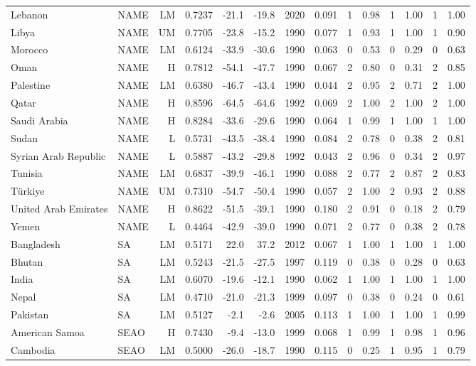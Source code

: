 \begin{longtable}{llrrrrrrrrrrrr}
Lebanon & NAME & LM & 0.7237 & -21.1 & -19.8 & 2020 & 0.091 & 1 & 0.98 & 1 & 1.00 & 1 & 1.00 \\
Libya & NAME & UM & 0.7705 & -23.8 & -15.2 & 1990 & 0.077 & 1 & 0.93 & 1 & 1.00 & 1 & 0.90 \\
Morocco & NAME & LM & 0.6124 & -33.9 & -30.6 & 1990 & 0.063 & 0 & 0.53 & 0 & 0.29 & 0 & 0.63 \\
Oman & NAME & H & 0.7812 & -54.1 & -47.7 & 1990 & 0.067 & 2 & 0.80 & 0 & 0.31 & 2 & 0.85 \\
Palestine & NAME & LM & 0.6380 & -46.7 & -43.4 & 1990 & 0.044 & 2 & 0.95 & 2 & 0.71 & 2 & 1.00 \\
Qatar & NAME & H & 0.8596 & -64.5 & -64.6 & 1992 & 0.069 & 2 & 1.00 & 2 & 1.00 & 2 & 1.00 \\
Saudi Arabia & NAME & H & 0.8284 & -33.6 & -29.6 & 1990 & 0.064 & 1 & 0.99 & 1 & 1.00 & 1 & 1.00 \\
Sudan & NAME & L & 0.5731 & -43.5 & -38.4 & 1990 & 0.084 & 2 & 0.78 & 0 & 0.38 & 2 & 0.81 \\
Syrian Arab Republic & NAME & L & 0.5887 & -43.2 & -29.8 & 1992 & 0.043 & 2 & 0.96 & 0 & 0.34 & 2 & 0.97 \\
Tunisia & NAME & LM & 0.6837 & -39.9 & -46.1 & 1990 & 0.088 & 2 & 0.77 & 2 & 0.87 & 2 & 0.83 \\
Türkiye & NAME & UM & 0.7310 & -54.7 & -50.4 & 1990 & 0.057 & 2 & 1.00 & 2 & 0.93 & 2 & 0.88 \\
United Arab Emirates & NAME & H & 0.8622 & -51.5 & -39.1 & 1990 & 0.180 & 2 & 0.91 & 0 & 0.18 & 2 & 0.79 \\
Yemen & NAME & L & 0.4464 & -42.9 & -39.0 & 1990 & 0.071 & 2 & 0.77 & 0 & 0.38 & 2 & 0.78 \\
Bangladesh & SA & LM & 0.5171 &  22.0 &  37.2 & 2012 & 0.067 & 1 & 1.00 & 1 & 1.00 & 1 & 1.00 \\
Bhutan & SA & LM & 0.5243 & -21.5 & -27.5 & 1997 & 0.119 & 0 & 0.38 & 0 & 0.28 & 0 & 0.63 \\
India & SA & LM & 0.6070 & -19.6 & -12.1 & 1990 & 0.062 & 1 & 1.00 & 1 & 1.00 & 1 & 1.00 \\
Nepal & SA & LM & 0.4710 & -21.0 & -21.3 & 1999 & 0.097 & 0 & 0.38 & 0 & 0.24 & 0 & 0.61 \\
Pakistan & SA & LM & 0.5127 &  -2.1 &  -2.6 & 2005 & 0.113 & 1 & 1.00 & 1 & 1.00 & 1 & 0.99 \\
American Samoa & SEAO & H & 0.7430 &  -9.4 & -13.0 & 1999 & 0.068 & 1 & 0.99 & 1 & 0.98 & 1 & 0.96 \\
Cambodia & SEAO & LM & 0.5000 & -26.0 & -18.7 & 1990 & 0.115 & 0 & 0.25 & 1 & 0.95 & 1 & 0.79 \\

\end{longtable}
